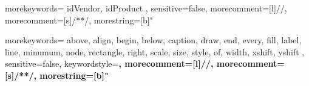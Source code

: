 
	
{
  morekeywords={
    idVendor,
    idProduct
  },
  sensitive=false, %
  morecomment=[l]{//}, %
  morecomment=[s]{/*}{*/}, %
  morestring=[b]" %
}

{
  morekeywords={
	above,
	align,
  	begin,
	below,
  	caption,
	draw,
	end,
	every,
	fill,
	label,
  	line,
	minumum,
	node,
	rectangle,
	right,
	scale,
	size,
  	style,
	of,
  	width,
  	xshift,
  	yshift
  },
  sensitive=false, %
  keywordstyle=\color{THIblue}\bfseries,
  morecomment=[l]{//}, %
  morecomment=[s]{/*}{*/}, %
  morestring=[b]" %
}